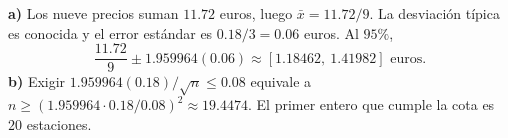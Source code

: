 \textbf{a)} Los nueve precios suman $11.72$ euros, luego
$\bar x=11.72/9$. La desviación típica es conocida y
el error estándar es $0.18/3=0.06$ euros. Al $95\%$,
\[
\frac{11.72}{9}\pm1.959964(0.06)
\approx\boxed{[1.18462,\ 1.41982]\text{ euros}}.
\]
\textbf{b)} Exigir $1.959964(0.18)/\sqrt n\le0.08$
equivale a $n\ge(1.959964\cdot0.18/0.08)^2\approx19.4474$.
El primer entero que cumple la cota es $\boxed{20}$ estaciones.
